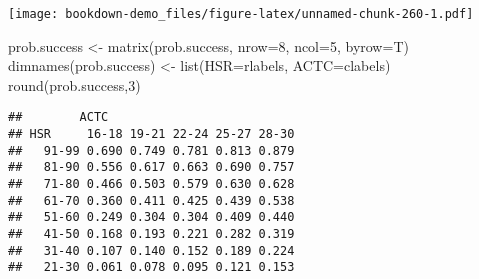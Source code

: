 \documentclass[
]{book}
\newenvironment{Shaded}{\begin{snugshade}}{\end{snugshade}}
\newcommand{\AttributeTok}[1]{\textcolor[rgb]{0.77,0.63,0.00}{#1}}
\newcommand{\DecValTok}[1]{\textcolor[rgb]{0.00,0.00,0.81}{#1}}
\newcommand{\FloatTok}[1]{\textcolor[rgb]{0.00,0.00,0.81}{#1}}
\newcommand{\FunctionTok}[1]{\textcolor[rgb]{0.00,0.00,0.00}{#1}}
\newcommand{\NormalTok}[1]{#1}
\newcommand{\OtherTok}[1]{\textcolor[rgb]{0.56,0.35,0.01}{#1}}
\newcommand{\SpecialCharTok}[1]{\textcolor[rgb]{0.00,0.00,0.00}{#1}}
\begin{document}
\texttt{[image: bookdown-demo\_files/figure-latex/unnamed-chunk-260-1.pdf]}

\begin{Shaded}
\end{Shaded}

\begin{Shaded}
\begin{Highlighting}[]
\NormalTok{prob.success }\OtherTok{\textless{}{-}} \FunctionTok{matrix}\NormalTok{(prob.success, }
                       \AttributeTok{nrow=}\DecValTok{8}\NormalTok{, }\AttributeTok{ncol=}\DecValTok{5}\NormalTok{, }\AttributeTok{byrow=}\NormalTok{T)}
\FunctionTok{dimnames}\NormalTok{(prob.success) }\OtherTok{\textless{}{-}} \FunctionTok{list}\NormalTok{(}\AttributeTok{HSR=}\NormalTok{rlabels,}
                               \AttributeTok{ACTC=}\NormalTok{clabels)}
\FunctionTok{round}\NormalTok{(prob.success,}\DecValTok{3}\NormalTok{)}
\end{Highlighting}
\end{Shaded}

\begin{verbatim}
##        ACTC
## HSR     16-18 19-21 22-24 25-27 28-30
##   91-99 0.690 0.749 0.781 0.813 0.879
##   81-90 0.556 0.617 0.663 0.690 0.757
##   71-80 0.466 0.503 0.579 0.630 0.628
##   61-70 0.360 0.411 0.425 0.439 0.538
##   51-60 0.249 0.304 0.304 0.409 0.440
##   41-50 0.168 0.193 0.221 0.282 0.319
##   31-40 0.107 0.140 0.152 0.189 0.224
##   21-30 0.061 0.078 0.095 0.121 0.153
\end{verbatim}

  
\end{document}

